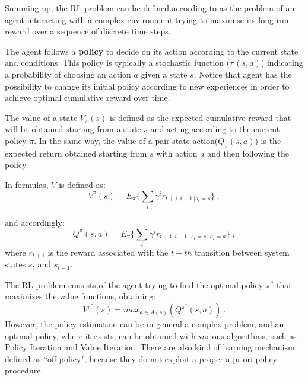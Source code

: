 \documentclass[10pt]{article}
\begin{document}
Summing up, the  RL  problem  can  be  defined according to \cite{diciotto} as  the  problem  of  an agent  interacting  with  a  complex environment trying to maximise its long-run reward over a sequence of discrete time steps.

The agent follows a \textbf{policy} to decide on its action according to the current state and conditions. 
This policy is typically a  stochastic  function ($\pi(s,a)$) indicating a probability  of  choosing an action $a$ given a state $s$.
Notice that agent has the possibility to change its initial policy  according  to  new experiences  in order to  achieve  optimal cumulative  reward  over  time.  

The  value  of  a  state $V_\pi(s)$  is  defined  as  the  expected  cumulative reward that  will  be  obtained starting from a state $s$ and acting according to the current policy $\pi$. 
In the same way, the value of  a pair state-action($Q_\pi(s,a)$) is  the  expected  return  obtained starting  from  $s$  with  action $a$  and  then following  the policy. 

In formulas, $V$ is defined as:
\begin{equation}
V^\pi(s)=E_\pi \{ \sum_i \gamma^i r_{t+1, i+1 ~ | s_t=s } \}~,
\end{equation}

and accordingly:
\begin{equation}
Q^\pi(s,a)=E_\pi \{ \sum_i \gamma^i r_{t+1, i+1 ~|~ s_t=s,~ a_t=a } \}~,
\end{equation}
where $r_{t+1}$ is the reward associated with the $t-th$ transition between system states $s_t$ and $s_{t+1}$.

The RL problem consists of the agent trying to find the optimal policy $\pi^*$ that maximizes the value  functions, obtaining:
\begin{equation}
V^{\pi^*}(s)= max_{a \in A(s)}(Q^{\pi^*}(s,a))~.
\end{equation} 
However, the policy estimation can be in general a complex problem, and an optimal policy, where it exists, can be obtained with various algorithms, such as Policy Iteration and Value Iteration. There are also kind of learning mechanism defined as ``off-policy", because they do not exploit a proper a-priori policy procedure.
\end{document}
